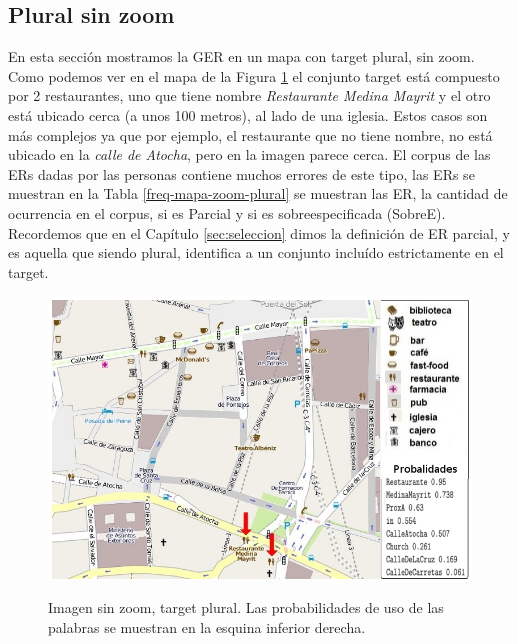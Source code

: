 \subsection{Plural sin zoom}
\label{sec:plural}


En esta secci\'on mostramos la GER en un mapa con target plural, sin zoom. Como podemos ver en el mapa de la Figura \ref{mapa-zoom-plural} el conjunto target est\'a compuesto por 2 restaurantes, uno que tiene nombre {\it Restaurante Medina Mayrit} y el otro est\'a ubicado cerca (a unos 100 metros), al lado de una iglesia. Estos casos son m\'as complejos ya que por ejemplo, el restaurante que no tiene nombre, no est\'a ubicado en la {\it calle de Atocha}, pero en la imagen parece cerca. El corpus de las ERs dadas por las personas contiene muchos errores de este tipo, las ERs se muestran en la Tabla \ref{freq-mapa-zoom-plural} se muestran las ER, la cantidad de ocurrencia en el corpus, si es Parcial y si es sobreespecificada (SobreE). 
Recordemos que en el Cap\'itulo \ref{sec:seleccion} dimos la definici\'on de ER parcial, y es aquella que siendo plural, identifica a un conjunto inclu\'ido estrictamente en el target.


\begin{figure}[H]
\centering
\includegraphics[width=\textwidth]{images/corpus/mapa10conProb.png}\\[0pt]
\caption{Imagen sin zoom, target plural. Las probabilidades de uso de las palabras se muestran en la esquina inferior derecha.}
\label{mapa-zoom-plural}
\end{figure}

